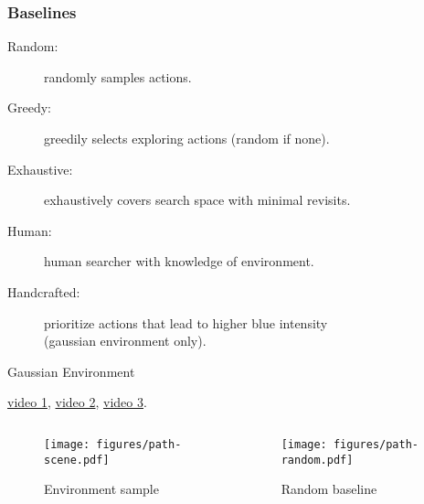 \begin{frame}
    \frametitle{Baselines}


    \begin{description}
        \item [Random:] randomly samples actions.
        \item [Greedy:] greedily selects exploring actions (random if none).
        \item [Exhaustive:] exhaustively covers search space with minimal revisits.
        \item [Human:] human searcher with knowledge of environment.
        \item[Handcrafted:] prioritize actions that lead to higher blue intensity\\ (gaussian environment only).
    \end{description}
\end{frame}


\begin{frame}
    \begin{table}
        \centering
        Gaussian Environment\par\vspace{0.5em}
        
    \end{table} 

    \begin{center}
        \href{run:./videos/gaussian/map/0.mp4}{video 1},
        \href{run:./videos/gaussian/map/1.mp4}{video 2},
        \href{run:./videos/gaussian/map/2.mp4}{video 3}.
    \end{center}
\end{frame}

\begin{frame}
    \begin{columns}
        \begin{column}{0.5\textwidth}
            \begin{figure}
                \centering
                \texttt{[image: figures/path-scene.pdf]}
                \par Environment sample
            \end{figure}
        \end{column}
        \begin{column}{0.5\textwidth}
            \begin{figure}
                \centering
                \texttt{[image: figures/path-random.pdf]}
                \par Random baseline
            \end{figure}
        \end{column}
    \end{columns}
\end{frame}

